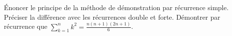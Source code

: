 %
%
	\begin{tasks}
		\task Énoncer le principe de la méthode de démonstration par récurrence simple.
		\task Préciser la différence avec les récurrences double et forte.
		\task Démontrer par récurrence que $\sum\limits_{k=1}^n k^2 = \frac{n(n+1)(2n+1)}{6}$.
	\end{tasks}

